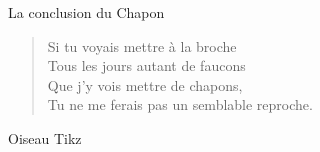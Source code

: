 \documentclass{LaBRI_poster}
\begin{document}
\begin{frame}[t]
\begin{columns}[t]
\begin{column}{\fourcolwidth}

\begin{block}{La conclusion du Chapon}

\begin{quote}
Si tu voyais mettre à la broche \\
Tous les jours autant de faucons \\
Que j’y vois mettre de chapons, \\
Tu ne me ferais pas un semblable reproche. 
\end{quote}
\end{block}


\begin{block}{Oiseau Tikz}
\begin{figure}[ht!]
\begin{center}
\end{center}
\end{figure}
\end{block}
\end{column}
\end{columns}
\end{frame}
\end{document}
